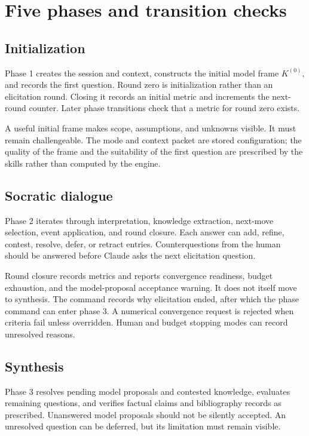 \documentclass[12pt,a4paper]{article}
\newcommand{\code}[1]{\texttt{\detokenize{#1}}}
\begin{document}
\section{Five phases and transition checks}
\subsection{Initialization}
Phase 1 creates the session and context, constructs the initial model frame $K^{(0)}$, and records the first question. Round zero is initialization rather than an elicitation round. Closing it records an initial metric and increments the next-round counter. Later phase transitions check that a metric for round zero exists.

A useful initial frame makes scope, assumptions, and unknowns visible. It must remain challengeable. The mode and context packet are stored configuration; the quality of the frame and the suitability of the first question are prescribed by the skills rather than computed by the engine.

\subsection{Socratic dialogue}
Phase 2 iterates through interpretation, knowledge extraction, next-move selection, event application, and round closure. Each answer can add, refine, contest, resolve, defer, or retract entries. Counterquestions from the human should be answered before Claude asks the next elicitation question.

Round closure records metrics and reports convergence readiness, budget exhaustion, and the model-proposal acceptance warning. It does not itself move to synthesis. The \code{converge} command records why elicitation ended, after which the phase command can enter phase 3. A numerical convergence request is rejected when criteria fail unless overridden. Human and budget stopping modes can record unresolved reasons.

\subsection{Synthesis}
Phase 3 resolves pending model proposals and contested knowledge, evaluates remaining questions, and verifies factual claims and bibliography records as prescribed. Unanswered model proposals should not be silently accepted. An unresolved question can be deferred, but its limitation must remain visible.
\end{document}

